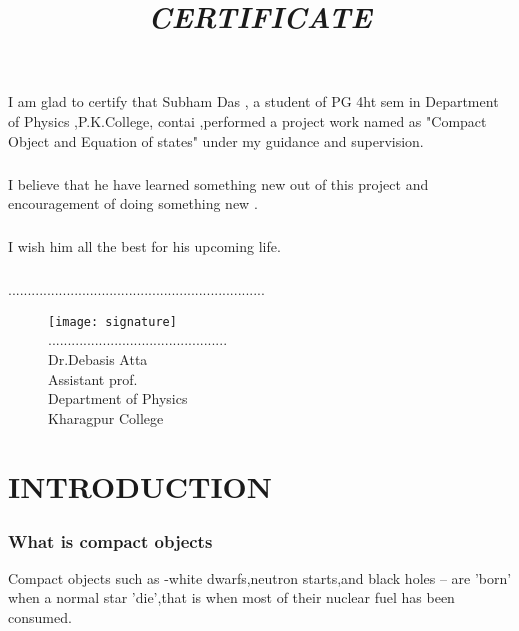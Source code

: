 \documentclass{report}
\begin{document}
\newpage 
\begin{center}
\title{\textit{CERTIFICATE}}
\maketitle
\paragraph{ } 
I am glad to certify that Subham Das , a student of PG 4ht sem in Department of Physics ,P.K.College, contai ,performed a project work named as "Compact Object and Equation of states" under my guidance and supervision.
\paragraph{ }
I believe that he have learned something new out of this project and encouragement of doing something new .
\paragraph{ }
I wish him all the best for his upcoming life.
\paragraph{ }
..................................................................\\
\begin{flushright}
\begin{figure}[hb!]
\texttt{[image: signature]}\\
..............................................\\
Dr.Debasis Atta\\
Assistant prof.\\
Department of Physics\\
Kharagpur College
\end{figure}
\end{flushright}
\end{center}
\newpage
\chapter{INTRODUCTION}
\subsection{What is compact objects}
Compact objects such as -white dwarfs,neutron starts,and black holes -- are 'born' when a normal star 'die',that is when most of their nuclear fuel has been consumed.
\end{document}
